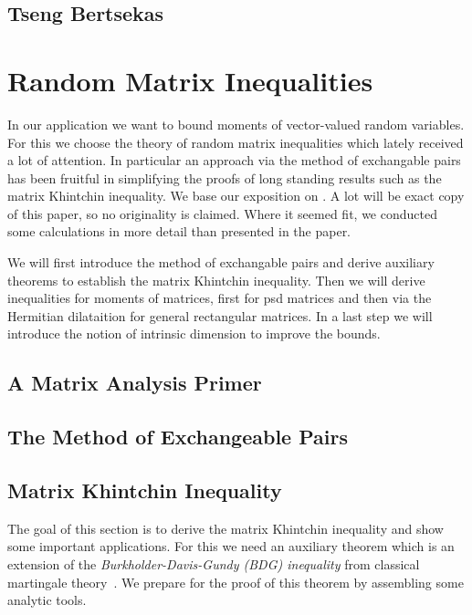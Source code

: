 \documentclass[12pt]{scrreport}
\begin{document}
  \section{Tseng Bertsekas}
  


\chapter{Random Matrix Inequalities}
  In our application we want to bound moments of vector-valued random variables.
  For this we choose the theory of random matrix inequalities
  which lately received a lot of attention.
  In particular an approach via the method of exchangable pairs \cite{Mackey2014}
  has been fruitful in simplifying the proofs of long standing results such as the matrix Khintchin inequality.
  We base our exposition on \cite{Mackey2014}. A lot will be exact copy of this paper, so no originality is claimed. Where it seemed fit, we conducted some calculations in more detail than presented in the paper. 

  We will first introduce the method of exchangable pairs and derive auxiliary theorems to establish the matrix Khintchin inequality.
  Then we will derive inequalities for moments of matrices, first for psd matrices and then via the Hermitian dilataition for general rectangular matrices. In a last step we will introduce the notion of intrinsic dimension to improve the bounds.

  \section{A Matrix Analysis Primer}
  
  \section{The Method of Exchangeable Pairs}
  
 \section{Matrix Khintchin Inequality}
 The goal of this section is to derive the matrix Khintchin inequality and show some important applications.
 For this we need an auxiliary theorem which is an extension of the 
 \textit{Burkholder-Davis-Gundy (BDG) inequality} from classical martingale theory~\cite{Burkholder1973}.
  We prepare for the proof of this theorem by assembling some analytic tools.
  
\end{document}

